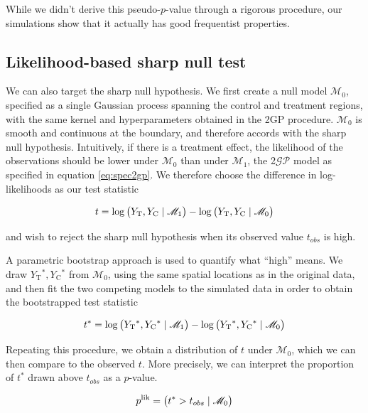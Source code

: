 \documentclass[letter]{article}
\let\Pr\relax
\DeclareMathOperator{\Pr}{\mathbb{P}}
\newcommand{\gp}{\mathcal{GP}}
\newcommand{\treat}{\mathrm{T}}
\newcommand{\ctrol}{\mathrm{C}}
\newcommand{\modnull}{\mathscr{M}_0}
\newcommand{\modalt}{\mathscr{M}_1}
\begin{document}
While we didn't derive this pseudo-\(p\)-value through a rigorous procedure, our simulations show that it actually has good frequentist properties.
    


    	\subsection{Likelihood-based sharp null test}\label{likelihood-based-sharp-null-test}

We can also target the sharp null hypothesis.
We first create a null model \(\modnull\),
specified as a single Gaussian process spanning the control and treatment regions,
with the same kernel and hyperparameters obtained in the 2GP procedure.
\(\modnull\) is smooth and continuous at the boundary,
and therefore accords with the sharp null hypothesis.
Intuitively, if there is a treatment effect,
the likelihood of the observations should be lower under \(\modnull\) than under \(\modalt\),
the 2\(\gp\) model as specified in equation \eqref{eq:spec2gp}.
We therefore choose the difference in log-likelihoods as our test statistic

\begin{equation}
    t = \log \Pr\del{Y_\treat{}, Y_\ctrol{} \mid \modalt} - \log \Pr\del{Y_\treat{}, Y_\ctrol{} \mid \modnull}
\end{equation}

and wish to reject the sharp null hypothesis when its observed value \(t_{obs}\) is high.

A parametric bootstrap approach is used to quantify what ``high'' means. We draw \(Y_\treat{}^*,Y_\ctrol{}^*\) from \(\modnull\),
using the same spatial locations as in the original data,
and then fit the two competing models to the simulated data in order to obtain the bootstrapped test statistic

\begin{equation}
    t^* = \log \Pr\del{Y_\treat{}^*, Y_\ctrol{}^* \mid \modalt} - \log \Pr\del{Y_\treat{}^*, Y_\ctrol{}^* \mid \modnull}
\end{equation}

Repeating this procedure, we obtain a distribution of \(t\) under \(\modnull\),
which we can then compare to the observed \(t\).
More precisely, we can interpret the proportion of \(t^*\) drawn above \(t_{obs}\) as a \(p\)-value.

\begin{equation}
    p^{\mathrm{lik}} = \Pr\del{t^* > t_{obs} \mid \modnull}
\end{equation}
\end{document}

